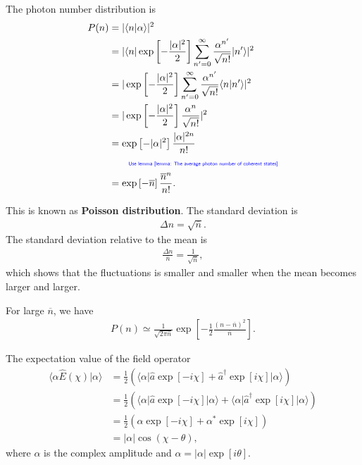 \documentclass[../../note.tex]{subfiles}
\begin{document}
\begin{lemma}
    The photon number distribution is
    \begin{align}
        P(n)
        &= \vert \langle n \vert \alpha \rangle \vert^2 \\
        &= \vert \langle n \vert \exp\left[-\frac{\vert \alpha \vert^2}{2}\right] \sum_{n^\prime=0}^{\infty} \frac{\alpha^{n^\prime}}{\sqrt{n !}} \vert n^{\prime} \rangle \vert^2 \\
        &= \vert \exp\left[-\frac{\vert \alpha \vert^2}{2}\right] \sum_{n^\prime=0}^{\infty} \frac{\alpha^{n^\prime}}{\sqrt{n !}} \langle n \vert n^{\prime} \rangle \vert^2 \\
        &= \vert \exp\left[-\frac{\vert \alpha \vert^2}{2}\right]  \frac{\alpha^{n}}{\sqrt{n !}}  \vert^2 \\
        &= \exp\left[-\vert \alpha \vert^2 \right] \frac{\vert \alpha\vert^{2 n}}{n !} \\
        &\qquad\text{\color{blue}{\tiny\sffamily Use lemma \ref{lemma: The average photon number of coherent states}}} \nonumber \\
        &= \exp\left[- \overline{n}\right] \frac{\overline{n}^n}{n !}.
    \end{align}
\end{lemma}

This is known as \textbf{Poisson distribution}. The standard deviation is
\begin{align}
    \Delta n = \sqrt{\overline{n}}.
\end{align}
The standard deviation relative to the mean is
\begin{align}
    \frac{\Delta n}{\overline{n}} = \frac{1}{\sqrt{\overline{n}}},
\end{align}
which shows that the fluctuations is smaller and smaller when the mean becomes larger and larger.

For large $\overline{n}$, we have
\begin{align}
    P(n) \simeq \frac{1}{\sqrt{2 \pi \overline{n}}} \exp\left[- \frac{1}{2} \frac{(n-\overline{n})^2}{\overline{n}}\right].
\end{align}

\begin{lemma}
    The expectation value of the field operator
    \begin{align}
        \langle \alpha \hat{E}(\chi) \vert \alpha \rangle 
        &= \frac{1}{2} (\langle \alpha \vert \hat{a} \exp\left[-i \chi\right] + \hat{a}^\dagger \exp\left[i \chi\right] \vert \alpha \rangle) \\
        &= \frac{1}{2}\left(\langle \alpha \vert \hat{a}\exp\left[-i \chi\right] \vert \alpha \rangle + \langle \alpha \vert \hat{a}^\dagger\exp\left[i \chi\right] \vert \alpha \rangle \right) \\
        &= \frac{1}{2}\left(\alpha \exp\left[-i \chi \right]+ \alpha^\ast \exp\left[i \chi\right]\right) \\
        &= \vert \alpha \vert \cos\left(\chi - \theta \right),
    \end{align}
    where $\alpha$ is the complex amplitude and $\alpha = \vert \alpha \vert \exp\left[i \theta \right]$.
\end{lemma}
\end{document}
